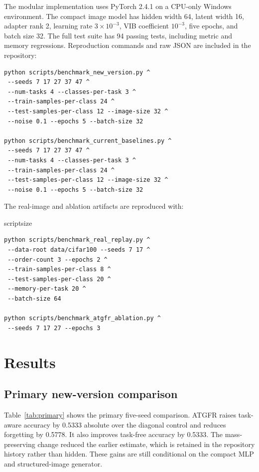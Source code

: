 \documentclass[conference]{IEEEtran}
\newcommand{\ATGFR}{\textsc{ATGFR}}
\begin{document}
The modular implementation uses PyTorch 2.4.1 on a CPU-only Windows
environment. The compact image model has hidden width 64, latent width 16,
adapter rank 2, learning rate \(3\times10^{-3}\), VIB coefficient
\(10^{-3}\), five epochs, and batch size 32. The full test suite has 94
passing tests, including metric and memory regressions. Reproduction commands
and raw JSON are included in the repository:
{\scriptsize
\begin{verbatim}
python scripts/benchmark_new_version.py ^
 --seeds 7 17 27 37 47 ^
 --num-tasks 4 --classes-per-task 3 ^
 --train-samples-per-class 24 ^
 --test-samples-per-class 12 --image-size 32 ^
 --noise 0.1 --epochs 5 --batch-size 32

python scripts/benchmark_current_baselines.py ^
 --seeds 7 17 27 37 47 ^
 --num-tasks 4 --classes-per-task 3 ^
 --train-samples-per-class 24 ^
 --test-samples-per-class 12 --image-size 32 ^
 --noise 0.1 --epochs 5 --batch-size 32
\end{verbatim}
}

The real-image and ablation artifacts are reproduced with:
{scriptsize
\begin{verbatim}
python scripts/benchmark_real_replay.py ^
 --data-root data/cifar100 --seeds 7 17 ^
 --order-count 3 --epochs 2 ^
 --train-samples-per-class 8 ^
 --test-samples-per-class 20 ^
 --memory-per-task 20 ^
 --batch-size 64

python scripts/benchmark_atgfr_ablation.py ^
 --seeds 7 17 27 --epochs 3
\end{verbatim}
}

\section{Results}
\label{sec:results}

\subsection{Primary new-version comparison}

Table~\ref{tab:primary} shows the primary five-seed comparison. \ATGFR{}
raises task-aware accuracy by 0.5333 absolute over the diagonal control and
reduces forgetting by 0.5778. It also improves task-free accuracy by 0.5333.
The mass-preserving change reduced the earlier estimate, which is retained in
the repository history rather than hidden. These gains are still conditional
on the compact MLP and structured-image generator.
\end{document}
